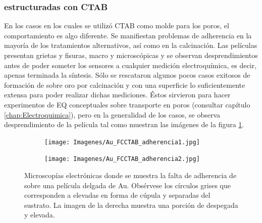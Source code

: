 			\subsubsection*{\pdm\space estructuradas con CTAB}	     		
				     		
			En los casos en los cuales se utilizó CTAB como molde para los poros, el comportamiento es algo diferente. Se manifiestan problemas de adherencia en la mayoría de los tratamientos alternativos, así como en la calcinación. Las películas presentan grietas y fisuras, macro y microscópicas y se observan desprendimientos antes de poder someter los sensores a cualquier medición electroquímica, es decir, apenas terminada la síntesis. Sólo se rescataron algunos pocos casos exitosos de formación de \pdmC\space sobre oro por calcinación y con una superficie lo suficientemente extensa para poder realizar dichas mediciones. Éstos sirvieron para hacer experimentos de EQ conceptuales sobre transporte en poros (consultar capítulo \ref{chap:Electroquimica}), pero en la generalidad de los casos, se observa desprendimiento de la película tal como muestran las imágenes de la figura \ref{fig:CTAB_adherencia}.

	     
				\begin{figure}[bh!]
		 	   	    \begin{subfigure}[t]{0.49\textwidth}
			        	\texttt{[image: Imagenes/Au\_FCCTAB\_adherencia1.jpg]}
			       		\end{subfigure}
					\begin{subfigure}[t]{0.49\textwidth}
			 	   	    \texttt{[image: Imagenes/Au\_FCCTAB\_adherencia2.jpg]}
			       		\end{subfigure}
					 \caption[Adherencia de CTAB sobre electrodos.]{Microscopías electrónicas donde se muestra la falta de adherencia de \pdmC\space sobre una película delgada de Au. Obsérvese los círculos grises que corresponden a \pdm\space elevadas en forma de cúpula y separadas del sustrato. La imagen de la derecha muestra una porción de \pdmC\space despegada y elevada.}
					 \label{fig:CTAB_adherencia}	
				     \end{figure}
			
